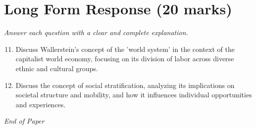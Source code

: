 \documentclass[12pt]{article}
\begin{document}
\section*{Long Form Response (20 marks)}
\textit{Answer each question with a clear and complete explanation.}
\begin{enumerate}[label=\arabic*.]
\setcounter{enumi}{10}
\item Discuss Wallerstein's concept of the 'world system' in the context of the capitalist world economy, focusing on its division of labor across diverse ethnic and cultural groups.
\item Discuss the concept of social stratification, analyzing its implications on societal structure and mobility, and how it influences individual opportunities and experiences.
\end{enumerate}

\vfill
\noindent\textit{End of Paper}
\end{document}
